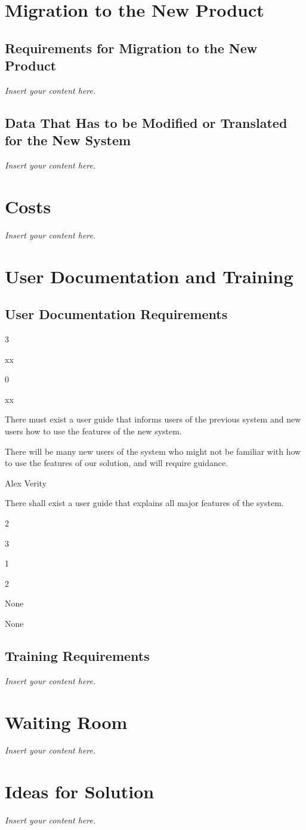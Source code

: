 \documentclass[12pt]{article}
\newenvironment{myreq}[1]{%
\setlist[description]{font=\normalfont\color{darkgray}}%
\begin{tcolorbox}[colframe=black,colback=white, sharp corners, boxrule=1pt]%
\bfseries\color{blue}%
\begin{description}#1}%
{\end{description}\end{tcolorbox}}
\newcommand{\threeinline}[3]{\begin{multicols}{3}#1 #2 #3\end{multicols}}
\newcommand{\twoinline}[2]{\begin{multicols}{2}#1 #2\end{multicols}}
\newcommand{\reqno}{\item[Requirement \#:]}
\newcommand{\reqtype}{\item[Requirement Type:]}
\newcommand{\reqevent}{\item[Event/BUC/PUC \#:]}
\newcommand{\reqdesc}{\item[Description:]}
\newcommand{\reqrat}{\item[Rationale:]}
\newcommand{\reqorig}{\item[Originator:]}
\newcommand{\reqfit}{\item[Fit Criterion:]}
\newcommand{\reqsatis}{\item[Customer Satisfaction:]}
\newcommand{\reqdissat}{\item[Customer Dissatisfaction:]}
\newcommand{\reqdep}{\item[Dependencies:]}
\newcommand{\reqconf}{\item[Conflicts:]}
\newcommand{\reqmater}{\item[Materials:]}
\newcommand{\reqhist}{\item[History:]}
\newcommand{\lips}{\textit{Insert your content here.}}
\begin{document}
\section{Migration to the New Product}
\subsection{Requirements for Migration to the New Product}
\lips

\subsection{Data That Has to be Modified or Translated for the New System}
\lips

\section{Costs}
\lips
\section{User Documentation and Training}
\subsection{User Documentation Requirements}

\begin{myreq}
  \threeinline
    {\reqno xx}
    {\reqtype 0}
    {\reqevent xx}
  \reqdesc There must exist a user guide that informs users of the previous
  system and new users how to use the features of the new system.
  \reqrat There will be many new users of the system who might not be familiar
  with how to use the features of our solution, and will require guidance.
  \reqorig Alex Verity
  \reqfit There shall exist a user guide that explains all major features of
  the system.
  \twoinline
    {\reqsatis 3}
    {\reqdissat 1}
  \twoinline
  {\reqdep None}
  {\reqconf None}
  \reqmater
  \reqhist
\end{myreq}

\subsection{Training Requirements}
\lips

\section{Waiting Room}
\lips

\section{Ideas for Solution}
\lips
\end{document}
